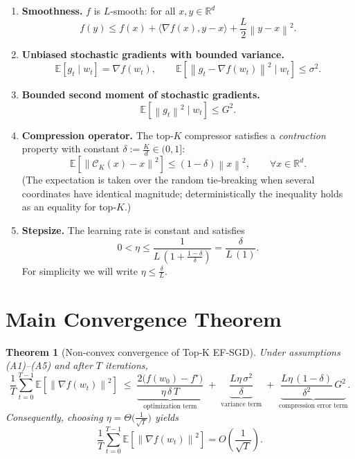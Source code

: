 \documentclass{article}
\newtheorem{theorem}{Theorem}
\newcommand{\E}{\mathbb{E}}
\newcommand{\R}{\mathbb{R}}
\newcommand{\norm}[1]{\left\|#1\right\|}
\newcommand{\topk}{\mathcal{C}_{K}}
\begin{document}
\begin{enumerate}
\item \textbf{Smoothness.} $f$ is $L$‑smooth: for all $x,y\in\R^{d}$
\[
f(y)\le f(x)+\langle\nabla f(x),y-x\rangle+\frac{L}{2}\norm{y-x}^{2}. \tag{A1}
\]

\item \textbf{Unbiased stochastic gradients with bounded variance.}
\[
\E\!\left[g_{t}\mid w_{t}\right]=\nabla f(w_{t}),\qquad
\E\!\left[\norm{g_{t}-\nabla f(w_{t})}^{2}\mid w_{t}\right]\le\sigma^{2}. \tag{A2}
\]

\item \textbf{Bounded second moment of stochastic gradients.}
\[
\E\!\left[\norm{g_{t}}^{2}\mid w_{t}\right]\le G^{2}. \tag{A3}
\]

\item \textbf{Compression operator.} The top‑$K$ compressor satisfies a
\emph{contraction} property with constant $\delta:=\frac{K}{d}\in(0,1]$:
\[
\E\!\left[\norm{\topk(x)-x}^{2}\right]\le (1-\delta)\norm{x}^{2},
\qquad\forall x\in\R^{d}. \tag{A4}
\]
(The expectation is taken over the random tie‑breaking when several coordinates have identical magnitude;
deterministically the inequality holds as an equality for top‑$K$.)

\item \textbf{Stepsize.} The learning rate is constant and satisfies
\[
0<\eta\le \frac{1}{L\,(1+\frac{1-\delta}{\delta})}
      =\frac{\delta}{L\,(1)}. \tag{A5}
\]
For simplicity we will write $\eta\le\frac{\delta}{L}$.
\end{enumerate}

\section*{Main Convergence Theorem}
\begin{theorem}[Non‑convex convergence of Top‑K EF‑SGD]\label{thm:main}
Under assumptions (A1)–(A5) and after $T$ iterations,
\[
\frac{1}{T}\sum_{t=0}^{T-1}\E\!\left[\norm{\nabla f(w_{t})}^{2}\right]
\;\le\;
\underbrace{\frac{2\bigl(f(w_{0})-f^{\star}\bigr)}{\eta\,\delta\,T}}_{\text{optimization term}}
\;+\;
\underbrace{\frac{L\eta\,\sigma^{2}}{\delta}}_{\text{variance term}}
\;+\;
\underbrace{\frac{L\eta\,(1-\delta)}{\delta^{2}}\,G^{2}}_{\text{compression error term}} .
\]
Consequently, choosing $\eta=\Theta\!\bigl(\tfrac{1}{\sqrt{T}}\bigr)$ yields
\[
\frac{1}{T}\sum_{t=0}^{T-1}\E\!\left[\norm{\nabla f(w_{t})}^{2}\right]
= O\!\left(\frac{1}{\sqrt{T}}\right).
\]
\end{theorem}
\end{document}
